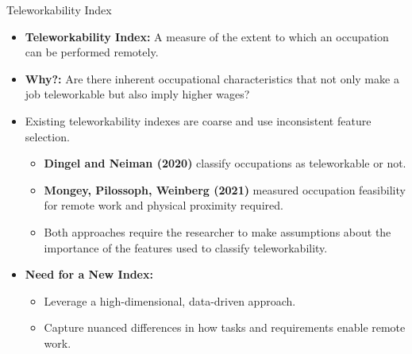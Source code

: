 \documentclass[aspectratio=1610]{beamer}
\begin{document}
\begin{frame}{Teleworkability Index}
    \begin{itemize}
        \item \textbf{Teleworkability Index:} A measure of the extent to which an occupation can be performed remotely. \pause \vspace{0.3cm}
        \item \textbf{Why?:} Are there inherent occupational characteristics that not only make a job teleworkable but also imply higher wages? \pause \vspace{0.3cm}
        \item Existing teleworkability indexes are coarse and use inconsistent feature selection.
        \begin{itemize}
            \item \textbf{Dingel and Neiman (2020)} classify occupations as teleworkable or not.
            \item \textbf{Mongey, Pilossoph, Weinberg (2021)} measured occupation feasibility for remote work and physical proximity required.
            \item Both approaches require the researcher to make assumptions about the importance of the features used to classify teleworkability.
        \end{itemize} \pause \vspace{0.3cm}
        \item \textbf{Need for a New Index:}
            \begin{itemize}
                \item Leverage a high-dimensional, data-driven approach.
                \item Capture nuanced differences in how tasks and requirements enable remote work.
            \end{itemize}
    \end{itemize}
\end{frame}
\end{document}
